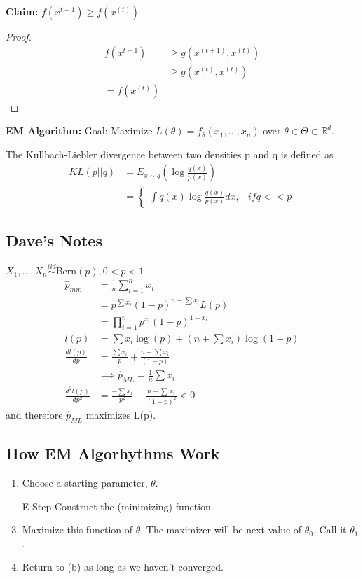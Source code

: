 \documentclass[11pt,fleqn]{book} %
\begin{document}
\textbf{Claim:} $f(x^{t+1}) \ge f(x^{(t)})$

\begin{proof}
	\begin{align*}
		f(x^{t+1}) &\ge g(x^{(t+1)}, x^{(t)})\\
		&\ge g(x^{(t)}, x^{(t)})\\
		= f(x^{(t)})
	\end{align*}
\end{proof}

\textbf{EM Algorithm:}
Goal: Maximize $L(\theta) = f_\theta(x_1, \dots, x_n)$ over $\theta \in \Theta \subset \mathbb{R}^d$.

\begin{definition}
	The Kullbach-Liebler divergence between two densities p and q is defined as 
	\begin{align*}
		KL(p||q) &= E_{x \sim q}(\log \frac{q(x)}{p(x)})\\
		&= \begin{cases}
			\int q(x)\log\frac{q(x)}{p(x)} dx, & if q<<p
		\end{cases}
	\end{align*}
	
\end{definition}

\subsection{Dave's Notes}

\begin{example}
	$X_1, \dots, X_n \stackrel{iid}{\sim} \text{Bern}(p), 0<p<1$
	\begin{align*}
		\hat{p}_{mm} &= \frac{1}{n} \sum \limits^n_{i=1} x_i\\
			&= p^{\sum x_i} (1-p)^{n - \sum x_i}
		L(p)\\  
		&= \prod\limits^n_{i=1} p^{x_i} (1-p)^{1-x_i}\\
		l(p) &= \sum x_i \log(p) + (n + \sum x_i) \log(1-p)\\
		\frac{d l(p)}{dp} &= \frac{\sum x_i}{p} + \frac{n - \sum x_i}{(1-p)}\\
			&\implies \hat{p}_{ML} = \frac{1}{n}\sum x_i\\
		\frac{d^2 l(p)}{dp^2} &= \frac{- \sum x_i}{p^2} - \frac{n - \sum x_i}{(1-p)^2} < 0
	\end{align*}
	and therefore $\hat{p}_{ML}$ maximizes L(p).
\end{example}

\subsection{How EM Algorhythms Work}
\begin{enumerate}[label = \alph*)]
	\item Choose a starting parameter, $\theta$. 
	\item [E-Step] Construct the (minimizing) function.
	\item Maximize this function of $\theta$. The maximizer will be next value of $\theta_0$. Call it $\theta_1$. 
	\item Return to (b) as long as we haven't converged.   
\end{enumerate}
\end{document}
